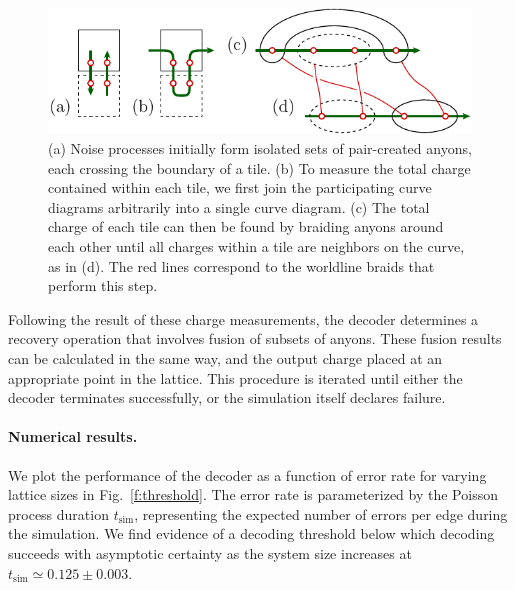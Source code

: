 \documentclass[aps, prl, letterpaper, twocolumn, superscriptaddress, notitlepage, 10pt]{revtex4-1}
\newcommand{\Fref}[1]{Fig.~\ref{#1}}
\begin{document}
\begin{figure}[t!]
\begin{center}
	\includegraphics[width=1.0\columnwidth]{pic-syndrome.pdf}
\caption{
(a) Noise processes initially form isolated sets of pair-created anyons, 
each crossing the boundary of a tile. 
(b) To measure the total charge 
contained within each tile, 
we first join the participating curve 
diagrams arbitrarily into a single curve diagram.
(c) The total charge of each tile can then be found 
by braiding anyons around each other until all charges within 
a tile are neighbors on the curve, as in (d).  
The red lines correspond to the worldline braids that perform this step.
}
\label{f:syndrome}
\end{center}
\vspace{-10pt}
\end{figure}

Following the result of these charge measurements, the decoder determines 
a recovery operation that involves fusion of subsets of anyons. 
These fusion results can be calculated in the same way, 
and the output charge placed at an appropriate point in the lattice. 
This procedure is iterated until either the decoder terminates successfully, 
or the simulation itself declares failure.


\paragraph{Numerical results.}

We plot the performance of the decoder as a function of error rate for varying lattice sizes in 
\Fref{f:threshold}. 
The error rate is parameterized by the Poisson process duration $t_{\mathrm{sim}}$, representing the expected number of errors per edge during the simulation. 
We find evidence of a decoding threshold below which decoding succeeds with asymptotic 
certainty as the system size increases at $t_{\mathrm{sim}}\simeq 0.125 \pm 0.003$.
\end{document}
